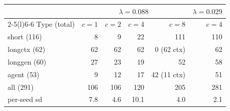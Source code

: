 \begin{tabular}{@{}lrrrrr@{}}
\toprule
 & \multicolumn{4}{c}{$\lambda{=}0.088$} & $\lambda{=}0.029$ \\
\cmidrule(lr){2-5}\cmidrule(l){6-6}
Type (total) & $c{=}1$ & $c{=}2$ & $c{=}4$ & $c{=}8$ & $c{=}4$ \\
\midrule
short (116) & 8 & 9 & 22 & 111 & 110 \\
longctx (62) & 62 & 62 & 62 & 0 (62 ctx) & 62 \\
longgen (60) & 27 & 23 & 19 & 52 & 58 \\
agent (53) & 9 & 12 & 17 & 42 (11 ctx) & 51 \\
\midrule
all (291) & 106 & 106 & 120 & 205 & 281 \\
per-seed sd & 7.8 & 4.6 & 10.1 & 4.0 & 2.1 \\
\bottomrule
\end{tabular}

